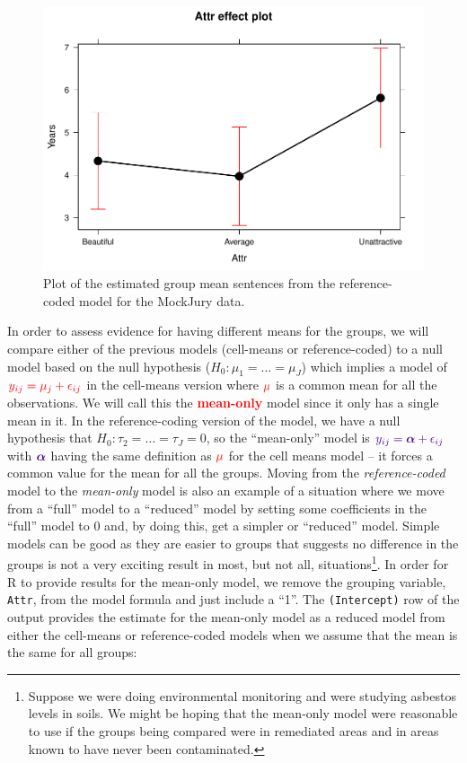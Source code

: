 \documentclass[]{book}
\let\rmarkdownfootnote\footnote%
\def\footnote{\protect\rmarkdownfootnote}
\begin{document}
\begin{figure}
\centering
\includegraphics{GreenwoodBanner_files/figure-latex/Figure3-2-1.pdf}
\caption{\label{fig:Figure3-2}Plot of the estimated group mean sentences from the
reference-coded model for the MockJury data.}
\end{figure}

In order to assess evidence for having different means for the groups,
we will compare either of the previous models (cell-means or
reference-coded) to a null model based on the null hypothesis
(\(H_0: \mu_1 = \ldots = \mu_J\)) which implies a model of
\(\color{red}{y_{ij} = \mu_j}+\epsilon_{ij}\) in the cell-means version
where \({\color{red}{\mu}}\) is a common mean for all the observations.
We will call this the \textcolor{red}{\textbf{mean-only}} model since it
only has a single mean in it. In the reference-coding version of the
model, we have a null hypothesis that
\(H_0: \tau_2 = \ldots = \tau_J = 0\), so the ``mean-only'' model is
\(\color{purple}{y_{ij} =\boldsymbol{\alpha}+\epsilon_{ij}}\) with
\(\color{purple}{\boldsymbol{\alpha}}\) having the same definition as
\(\color{red}{\mu}\) for the cell means model -- it forces a common
value for the mean for all the groups. Moving from the
\emph{reference-coded} model to the \emph{mean-only} model is also an
example of a situation where we move from a ``full'' model to a
``reduced'' model by setting some coefficients in the ``full'' model to
0 and, by doing this, get a simpler or ``reduced'' model. Simple models
can be good as they are easier to groups that suggests no difference in
the groups is not a very exciting result in most, but not all,
situations\footnote{Suppose we were doing environmental monitoring and
  were studying asbestos levels in soils. We might be hoping that the
  mean-only model were reasonable to use if the groups being compared
  were in remediated areas and in areas known to have never been
  contaminated.}. In order for R to provide results for the mean-only
model, we remove the grouping variable, \texttt{Attr}, from the model
formula and just include a ``1''. The \texttt{(Intercept)} row of the
output provides the estimate for the mean-only model as a reduced model
from either the cell-means or reference-coded models when we assume that
the mean is the same for all groups:
\end{document}
